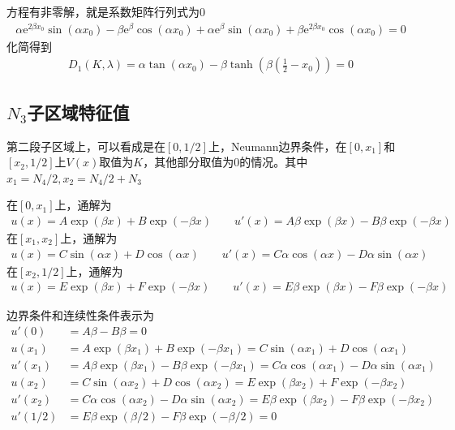 \documentclass[12pt,a4paper]{article}
\begin{document}
方程有非零解，就是系数矩阵行列式为0
\begin{align*}
\alpha \mathrm{e}^{2 \beta x_0} \sin\!\left(\alpha x_0\right) - \beta \mathrm{e}^{\beta} \cos\!\left(\alpha x_0\right) + \alpha \mathrm{e}^{\beta} \sin\!\left(\alpha x_0\right) + \beta \mathrm{e}^{2 \beta x_0} \cos\!\left(\alpha x_0\right) = 0
\end{align*}
化简得到
\begin{align*}
D_1(K, \lambda) = \alpha \tan(\alpha x_0) - \beta \tanh(\beta (\frac12 - x_0)) = 0
\end{align*}

\subsection*{$N_3$子区域特征值}

第二段子区域上，可以看成是在$[0, 1/2]$上，Neumann边界条件，在$[0, x_1]$和$[x_2, 1/2]$上$V(x)$取值为$K$，其他部分取值为$0$的情况。其中$x_1 = N_4/2, x_2 = N_4/2 + N_3$

在$[0, x_1]$上，通解为
\begin{align*}
u(x) = A \exp(\beta x) + B \exp(-\beta x) \qquad u'(x) = A \beta \exp(\beta x) - B \beta \exp(-\beta x)
\end{align*}
在$[x_1, x_2]$上，通解为
\begin{align*}
u(x) = C \sin(\alpha x) + D \cos(\alpha x) \qquad u'(x) = C \alpha \cos(\alpha x) - D \alpha \sin(\alpha x)
\end{align*}
在$[x_2, 1/2]$上，通解为
\begin{align*}
u(x) = E \exp(\beta x) + F \exp(-\beta x) \qquad u'(x) = E \beta \exp(\beta x) - F \beta \exp(-\beta x)
\end{align*}

边界条件和连续性条件表示为
\begin{align*}
u'(0) & = A \beta - B \beta = 0 \\
u(x_1) & = A \exp(\beta x_1) + B \exp(-\beta x_1) = C \sin(\alpha x_1) + D \cos(\alpha x_1) \\
u'(x_1) & = A \beta \exp(\beta x_1) - B \beta \exp(-\beta x_1) = C \alpha \cos(\alpha x_1) - D \alpha \sin(\alpha x_1) \\
u(x_2) & = C \sin(\alpha x_2) + D \cos(\alpha x_2) = E \exp(\beta x_2) + F \exp(-\beta x_2) \\
u'(x_2) & = C \alpha \cos(\alpha x_2) - D \alpha \sin(\alpha x_2) = E \beta \exp(\beta x_2) - F \beta \exp(-\beta x_2) \\
u'(1/2) & = E \beta \exp(\beta/2) - F \beta \exp(-\beta/2) = 0
\end{align*}
\end{document}
